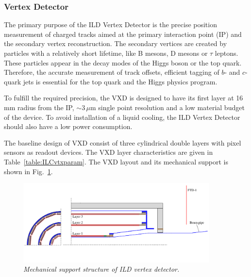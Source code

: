 

\subsubsection{Vertex Detector}
The primary purpose of the ILD Vertex Detector is the precise position measurement of charged tracks aimed at the primary interaction point (IP) and the secondary vertex reconstruction.
The secondary vertices are created by particles with a relatively short lifetime, like B mesons, D mesons or $\tau$ leptons. These particles appear in the decay modes of the Higgs boson or the top quark. Therefore, the accurate measurement of track offsets, efficient tagging of $b$- and $c$-quark jets is essential for the top quark and the Higgs physics program. %

To fulfill the required precision, the VXD is designed to have its first layer at 16\,mm radius from the IP, $\sim 3\,\mu$m single point resolution and a low material budget of the device. To avoid installation of a liquid cooling, the ILD Vertex Detector should also have a low power consumption.

The baseline design of VXD consist of three cylindrical double layers with pixel sensors as readout devices. The VXD layer characteristics are given in Table~\ref{table:ILCvtxparam}.
The VXD layout and its mechanical support is shown in Fig.~\ref{fig:ILCvtxsupport}. 



\begin{figure}
\centering

    \includegraphics[width=0.9\textwidth]{graphics/ILCvtxsupport.png}
    \caption{\sl Mechanical support structure of ILD vertex detector.}
    \label{fig:ILCvtxsupport}


\end{figure}

